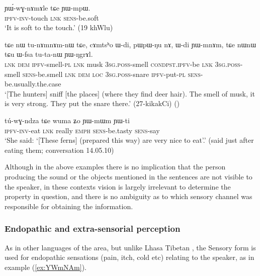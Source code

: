 \begin{exe}
\ex \label{ex:YWmpW}
\gll ɲɯ́-wɣ-nɤmɤle tɕe ɲɯ-mpɯ. \\
\textsc{ipfv}-\textsc{inv}-touch \textsc{lnk} \textsc{sens}-be.soft \\
\glt `It is soft to the touch.' (19 khWlu)
\end{exe}

\begin{exe}
\ex \label{ex:tunAmnAmnW}
\gll tɕe nɯ tu-nɤmnɤm-nɯ tɕe, cɤmtsʰo ɯ-di, pɯ\redp{}pɯ-ŋu nɤ, ɯ-di ɲɯ-mnɤm, tɕe nɯnɯ tɕu ɯ-fsa tu-ta-nɯ ɲɯ-ŋgrɤl. \\
\textsc{lnk} \textsc{dem} \textsc{ipfv}-smell-\textsc{pl} \textsc{lnk} musk \textsc{3sg}.\textsc{poss}-smell \textsc{cond\redp{}pst.ipfv}-be \textsc{lnk} \textsc{3sg}.\textsc{poss}-smell \textsc{sens}-be.smell \textsc{lnk} \textsc{dem} \textsc{loc} \textsc{3sg}.\textsc{poss}-snare \textsc{ipfv}-put-\textsc{pl} \textsc{sens}-be.usually.the.case \\
\glt `[The hunters] sniff [the places] (where they find deer hair). The smell of musk, it is very strong. They put the snare there.' (27-kikakCi)
()
\end{exe}

\begin{exe}
\ex \label{ex:YWmWm}
\gll tú-wɣ-ndza tɕe wuma ʑo ɲɯ-mɯm ɲɯ-ti \\
\textsc{ipfv}-\textsc{inv}-eat \textsc{lnk} really \textsc{emph} \textsc{sens}-be.tasty \textsc{sens}-say \\
\glt `She said: `[These ferns] (prepared this way) are very nice to eat'.' (said just after eating them; conversation 14.05.10)
\end{exe}

Although in the above examples there is no implication that the person producing the sound or the objects mentioned in the sentences are not visible to the speaker, in these contexts vision is largely irrelevant to determine the property in question, and there is no ambiguity as to which sensory channel was responsible for obtaining the information.  


\subsubsection{Endopathic and extra-sensorial perception} \label{sec:sensory.endopathic}
As in other languages of the area, but unlike Lhasa Tibetan \citep{tournadre14evidentiality}, the Sensory form is used for endopathic sensations (pain, itch, cold etc)  relating to the speaker, as in example (\ref{ex:YWmNAm}).

